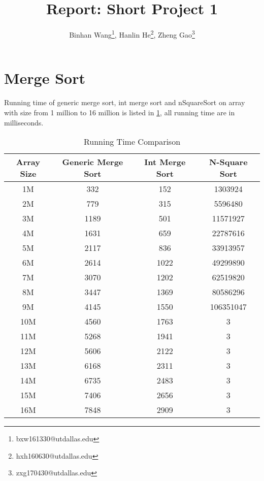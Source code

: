\documentclass[10pt]{article}
\title{\vspace*{-1em}Report: Short Project 1}
\author{Binhan Wang\footnote{bxw161330@utdallas.edu}, Hanlin He\footnote{hxh160630@utdallas.edu},
Zheng Gao\footnote{zxg170430@utdallas.edu}}
\begin{document}
\maketitle

\section{Merge Sort}

Running time of generic merge sort, int merge sort and nSquareSort on array
with size from 1 million to 16 million is listed in \cref{r1}, all running time
are in milliseconds.

\begin{table}[H]
    \centering
    \caption{Running Time Comparison}\label{r1}
    \begin{tabular}{c|ccc}
        Array Size & Generic Merge Sort & Int Merge Sort & N-Square Sort \\\hline\hline
        1M & 332 & 152 & 1303924\\
        2M & 779 & 315 & 5596480 \\
        3M & 1189 & 501 & 11571927 \\
        4M & 1631 & 659 & 22787616 \\
        5M & 2117 & 836 & 33913957 \\
        6M & 2614 & 1022 & 49299890 \\
        7M & 3070 & 1202 & 62519820 \\
        8M & 3447 & 1369 & 80586296 \\
        9M & 4145 & 1550 & 106351047 \\
        10M & 4560 & 1763 & 3 \\
        11M & 5268 & 1941 & 3 \\
        12M & 5606 & 2122 & 3 \\
        13M & 6168 & 2311 & 3 \\
        14M & 6735 & 2483 & 3 \\
        15M & 7406 & 2656 & 3 \\
        16M & 7848 & 2909 & 3 \\
    \end{tabular}
\end{table}
\end{document}
